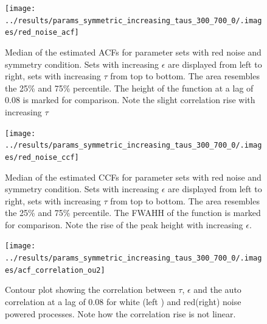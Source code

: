 \documentclass[a4paper,12pt]{book}
\theoremstyle{break}
\begin{document}
\begin{figure}[htp]
	\texttt{[image: ../results/params\_symmetric\_increasing\_taus\_300\_700\_0/.images/red\_noise\_acf]}%
	\caption{Median of the estimated ACFs for parameter sets with red noise and symmetry condition. Sets with increasing $\epsilon$ are displayed from left to right, sets with increasing $\tau$ from top to bottom. The area resembles the 25\% and 75\% percentile. The height of the function at a lag of 0.08 is marked for comparison. Note the slight correlation rise with increasing $\tau$ }%
	\label{f/a/acf_red_sym}%
\end{figure}

\begin{figure}[htp]
	\texttt{[image: ../results/params\_symmetric\_increasing\_taus\_300\_700\_0/.images/red\_noise\_ccf]}%
	\caption{Median of the estimated CCFs for parameter sets with red noise and symmetry condition. Sets with increasing $\epsilon$ are displayed from left to right, sets with increasing $\tau$ from top to bottom. The area resembles the 25\% and 75\% percentile. The \ac{FWAHH} of the function is marked for comparison. Note the rise of the peak height with increasing $\epsilon$. }%
	\label{f/a/ccf_red_sym}
\end{figure}

\begin{figure}[htp]
	\texttt{[image: ../results/params\_symmetric\_increasing\_taus\_300\_700\_0/.images/acf\_correlation\_ou2]}%
	\caption{Contour plot showing the correlation between $\tau$, $\epsilon$ and the auto correlation at a lag of 0.08 for white (left ) and red(right) noise powered processes. Note how the correlation rise is not linear.}%
	\label{f/a/acf_white_sym_correlation_ou2}%
\end{figure}

\appendix




\clearpage


\thispagestyle{empty}
\end{document}
